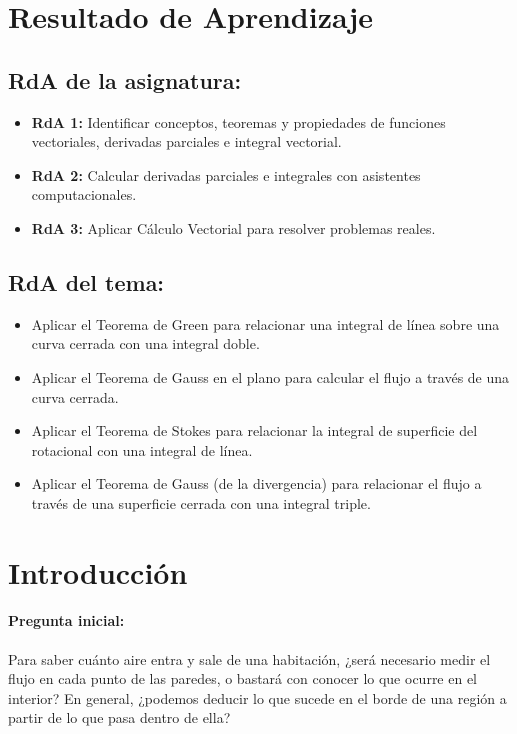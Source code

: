 \documentclass[a4,11pt]{aleph-notas}
\begin{document}
\encabezado

\section*{Resultado de Aprendizaje}

\subsection*{RdA de la asignatura:}
\begin{itemize}[leftmargin=*]
    \item \textbf{RdA 1:} Identificar conceptos, teoremas y propiedades de funciones vectoriales, derivadas parciales e integral vectorial.
    \item \textbf{RdA 2:} Calcular derivadas parciales e integrales con asistentes computacionales.
    \item \textbf{RdA 3:} Aplicar Cálculo Vectorial para resolver problemas reales.
\end{itemize}

\subsection*{RdA del tema:}
\begin{itemize}[leftmargin=*]
    \item Aplicar el Teorema de Green para relacionar una integral de línea sobre una curva cerrada con una integral doble.
    \item Aplicar el Teorema de Gauss en el plano para calcular el flujo a través de una curva cerrada.
    \item Aplicar el Teorema de Stokes para relacionar la integral de superficie del rotacional con una integral de línea.
    \item Aplicar el Teorema de Gauss (de la divergencia) para relacionar el flujo a través de una superficie cerrada con una integral triple.
\end{itemize}

\section*{Introducción}

\paragraph{Pregunta inicial:}
Para saber cuánto aire entra y sale de una habitación, ¿será necesario medir el flujo en cada punto de las paredes, o bastará con conocer lo que ocurre en el interior? En general, ¿podemos deducir lo que sucede en el borde de una región a partir de lo que pasa dentro de ella?
\end{document}
